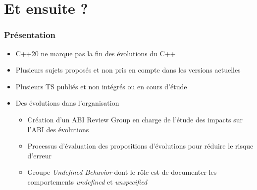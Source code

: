 \documentclass[C++.tex]{subfiles}
\begin{document}
\section{Et ensuite ?}

\begin{frame}
	\frametitle{Présentation}
	\begin{itemize}
		\item C++20 ne marque pas la fin des évolutions du C++
		\item Plusieurs sujets proposés et non pris en compte dans les versions actuelles
		\item Plusieurs TS publiés et non intégrés ou en cours d'étude
		\item Des évolutions dans l'organisation
		\begin{itemize}
			\item Création d'un ABI Review Group en charge de l'étude des impacts sur l'ABI des évolutions
			\item Processus d'évaluation des propositions d'évolutions pour réduire le risque d'erreur
			\item Groupe \og \textit{Undefined Behavior}\fg{} dont le rôle est de documenter les comportements \og \textit{undefined}\fg{} et \og \textit{unspecified}\fg{}
		\end{itemize}
	\end{itemize}
\end{frame}
\end{document}
